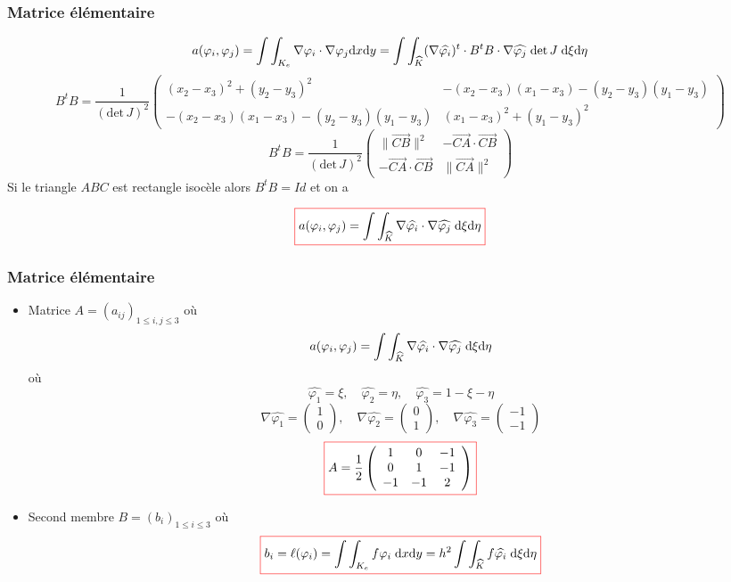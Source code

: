 \documentclass{beamer}
\def \de {{\rm d}}
\newcommand{\myredbox}[1]{\fcolorbox{red}{white}{$\displaystyle#1$}}
\begin{document}
\begin{frame}
\frametitle{Matrice élémentaire}
\[a(\varphi_i,\varphi_j)=\displaystyle \int\int_{K_e}\nabla \varphi_i\cdot \nabla \varphi_j \de x\de y=\displaystyle \int\int_{\widehat{K}}(\nabla \widehat{\varphi_i})^t\cdot B^tB\cdot \nabla \widehat{\varphi_j}\;\mbox{det}\,  J\;\de\xi\de\eta\] 
{\tiny
\[B^tB=\frac{1}{\left(\mbox{det}\,  J\right)^2}\left(\begin{array}{cc}
(x_2-x_3)^2+(y_2-y_3)^2   &-(x_2-x_3)(x_1-x_3)-(y_2-y_3)(y_1-y_3)  \\
-(x_2-x_3)(x_1-x_3)-(y_2-y_3)(y_1-y_3) & (x_1-x_3)^2+(y_1-y_3)^2
\end{array}\right)\]
}
\[B^tB=\frac{1}{\left(\mbox{det}\,  J\right)^2}\left(\begin{array}{cc}
\|\overrightarrow{CB}\|^2   &-\overrightarrow{CA}\cdot \overrightarrow{CB} \\
-\overrightarrow{CA}\cdot \overrightarrow{CB} & \|\overrightarrow{CA}\|^2
\end{array}\right)\]
Si le triangle $ABC$ est rectangle isocèle alors $B^tB=Id$ et on a

\[\myredbox{a(\varphi_i,\varphi_j)=\displaystyle \int\int_{\widehat{K}}\nabla \widehat{\varphi_i} \cdot \nabla \widehat{\varphi_j}\;\de\xi\de\eta}\] 
\end{frame}


\begin{frame}
\frametitle{Matrice élémentaire}
\begin{itemize}
\item Matrice $A=(a_{ij})_{1\leq i,j \leq 3}$ où 
\[a(\varphi_i,\varphi_j)=\displaystyle \int\int_{\widehat{K}}\nabla \widehat{\varphi_i} \cdot \nabla \widehat{\varphi_j}\;\de\xi\de\eta\]
où
\[\widehat{\varphi_1}=\xi,\quad \widehat{\varphi_2}=\eta,\quad \widehat{\varphi_3}=1-\xi-\eta\] 
\[\nabla\widehat{\varphi_1}=\left(\begin{array}{c} 1\\0\end{array}\right)
 ,\quad \nabla\widehat{\varphi_2}=\left(\begin{array}{c} 0\\1\end{array}\right),\quad \nabla\widehat{\varphi_3}=\left(\begin{array}{c} -1\\-1\end{array}\right)\] 
 \[\myredbox{A=\frac 12 \left(\begin{array}{ccc} 1&0&-1\\0&1&-1\\-1&-1&2\end{array}\right)}\]
 \item Second membre $B=(b_i)_{1\leq i\leq 3}$ où
 \[\myredbox{b_{i} = \ell(\varphi_i)=\displaystyle \int\int_{K_e} f \varphi_i \;\de x\de y =h^2\displaystyle \int\int_{\widehat{K}} f \widehat{\varphi_i} \;\de\xi\de\eta}\] 
\end{itemize}
\end{frame}
\end{document}
